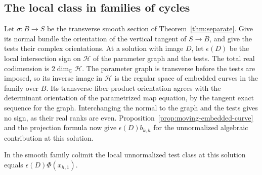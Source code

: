 \subsection{The local class in families of cycles}

Let $\sigma:B\to S$ be the transverse smooth section of
Theorem~\ref{thm:separate}. Give its normal bundle the orientation
of the vertical tangent of $S\to B$, and give the tests their complex
orientations. At a solution with image $D$, let $\epsilon(D)$ be
the local intersection sign on $\mathcal H$ of the parameter graph and the
tests. The total real codimension is $2\dim_{\mathbb C} \mathcal H$.
The parameter graph is transverse before the tests are imposed, so
its inverse image in $\mathcal H$ is the regular space of embedded curves in
the family over $B$. Its transverse-fiber-product orientation agrees
with the determinant orientation of the parametrized map equation,
by the tangent exact sequence for the graph. Interchanging the
normal to the graph and the tests gives no sign, as their real ranks
are even. Proposition~\ref{prop:moving-embedded-curve} and the
projection formula now give $\epsilon(D)b_{k,h}$ for the
unnormalized algebraic contribution at this solution.

\begin{lemma}\label{lem:signed-embedded-cycle}
In the smooth family colimit the local unnormalized test class at
this solution equals $\epsilon(D)\Phi(x_{h,1})$.
\end{lemma}

